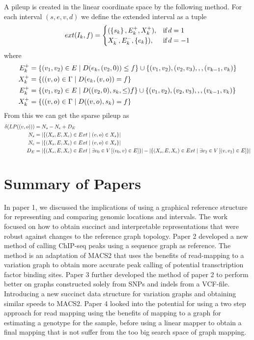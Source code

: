 A pileup is created in the linear coordinate space by the following method. 
For each interval $(s, e, v, d)$ we define the extended interval as a tuple 
\[ext(I_k, f) = 
  \begin{cases}
    (\left\{s_k\right\}, E_k^+, X_k^+) , & \text{if} \, d = 1\\
    X_k^-, E_k^-, \left\{e_k\right\}), & \text{if} \, d = -1\\
                      \end{cases}
                    \]
 where 
\begin{align*}
E_k^+ &= \left\{(v_1, v_2) \in E \mid D(e_k, (v_2, 0))\leq f\right\} \cup \left\{(v_1, v_2), (v_2, v_3),,,(v_{k-1}, v_{k})\right\}\\
  X_k^+ &= \left\{((v, o) \in \Gamma \mid D(e_k, (v, o))=f\right\}\\
  E_k^+ &= \left\{(v_1, v_2) \in E \mid D((v_2, 0), s_k, \leq) f\right\} \cup \left\{(v_1, v_2), (v_2, v_3),,,(v_{k-1}, v_{k})\right\}\\
X_k^+ &= \left\{((v, o) \in \Gamma \mid D((v, o), s_k)=f\right\}\\
\end{align*}
From this we can get the sparse pileup as
\begin{align*}
  \delta(LP((v, o))) &= N_s-N_e+D_E\\
  N_s &= \left|\left\{(X_s, E, X_e) \in Ext \mid (v, o) \in X_s\right\}\right|\\
  N_e &= \left|\left\{(X_s, E, X_e) \in Ext \mid (v, o) \in X_s\right\}\right|\\
  D_E &= \left|\left\{(X_s, E, X_e) \in Ext \mid \exists v_0 \in V \left[(v_0, v) \in E\right]\right\}\right|-
        \left|\left\{(X_s, E, X_e) \in Ext \mid \exists v_2 \in V \left[(v, v_2) \in E\right]\right\}\right|
\end{align*}
\chapter{Summary of Papers}
In paper 1, we discussed the implications of using a graphical reference structure for representing and comparing genomic locations and intervals.
The work focused on how to obtain succinct and interpretable representations that were robust against changes to the reference graph topology. 
Paper 2 developed a new method of calling ChIP-seq peaks using a sequence graph as reference.
The method is an adaptation of MACS2 that uses the benefits of read-mapping to a variation graph to obtain more accurate peak calling of potential transctription factor binding sites. 
Paper 3 further developed the method of paper 2 to perform better on graphs constructed solely from SNPs and indels from a VCF-file. Introducing a new succinct data structure for variation graphs and obtaining similar speeds to MACS2.
Paper 4 looked into the potential for using a two step approach for read mapping using the benefits of mapping to a graph for estimating a genotype for the sample, before using a linear mapper to obtain a final mapping that is not suffer from the too big search space of graph mapping. 


